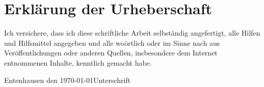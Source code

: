 \chapter*{Erklärung der Urheberschaft}

Ich versichere, dass ich diese schriftliche Arbeit selbst\"andig angefertigt, alle Hilfen und Hilfsmittel angegeben und alle wo\"ortlich oder im Sinne nach aus Ver\"offentlichungen oder anderen Quellen, insbesondere dem Internet entnommenen Inhalte, kenntlich gemacht habe.

\vspace{4cm}

\hspace{2cm} Entenhausen den \today \hfill Unterschrift \hspace{2cm}
